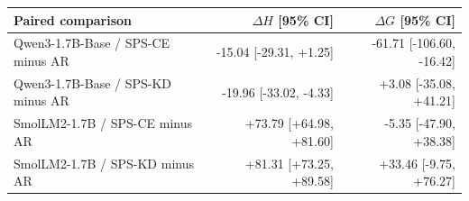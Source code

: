 \begin{tabular}{lrr}
\toprule
Paired comparison & $\Delta H$ [95\% CI] & $\Delta G$ [95\% CI] \\
\midrule
Qwen3-1.7B-Base / SPS-CE minus AR & -15.04 [-29.31, +1.25] & -61.71 [-106.60, -16.42] \\
Qwen3-1.7B-Base / SPS-KD minus AR & -19.96 [-33.02, -4.33] & +3.08 [-35.08, +41.21] \\
SmolLM2-1.7B / SPS-CE minus AR & +73.79 [+64.98, +81.60] & -5.35 [-47.90, +38.38] \\
SmolLM2-1.7B / SPS-KD minus AR & +81.31 [+73.25, +89.58] & +33.46 [-9.75, +76.27] \\
\bottomrule
\end{tabular}
